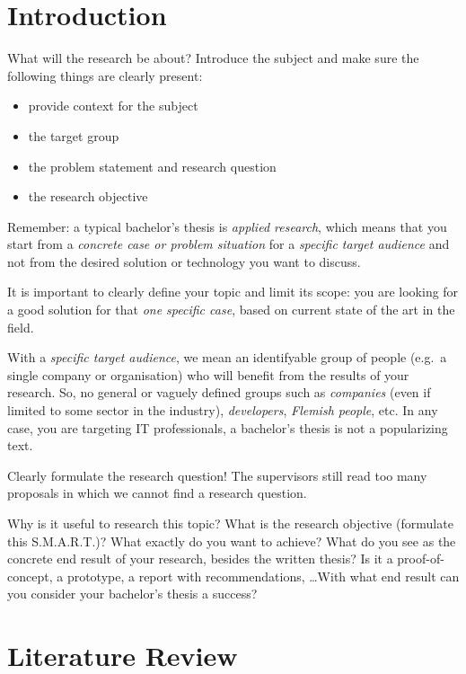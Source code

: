 \documentclass[english]{hogent-article}
\begin{document}
\section{Introduction}
\label{sec:Introduction}

What will the research be about? Introduce the subject and make sure the following things are clearly present:

\begin{itemize}
  \item provide context for the subject
  \item the target group
  \item the problem statement and research question
  \item the research objective
\end{itemize}

Remember: a typical bachelor's thesis is \emph{applied research}, which means that you start from a \emph{concrete case or problem situation} for a \emph{specific target audience} and not from the desired solution or technology you want to discuss.

It is important to clearly define your topic and limit its scope: you are looking for a good solution for that \textit{one specific case}, based on current state of the art in the field.

With a \emph{specific target audience}, we mean an identifyable group of people (e.g.\ a single company or organisation) who will benefit from the results of your research. So, no general or vaguely defined groups such as \emph{companies} (even if limited to some sector in the industry), \emph{developers}, \emph{Flemish people}, etc. In any case, you are targeting IT professionals, a bachelor's thesis is not a popularizing text.

Clearly formulate the research question! The supervisors still read too many proposals in which we cannot find a research question.

Why is it useful to research this topic? What is the research objective (formulate this S.M.A.R.T.)? What exactly do you want to achieve? What do you see as the concrete end result of your research, besides the written thesis? Is it a proof-of-concept, a prototype, a report with recommendations, \ldots With what end result can you consider your bachelor's thesis a success?

\section{Literature Review}%
\label{sec:literature review}
\end{document}
